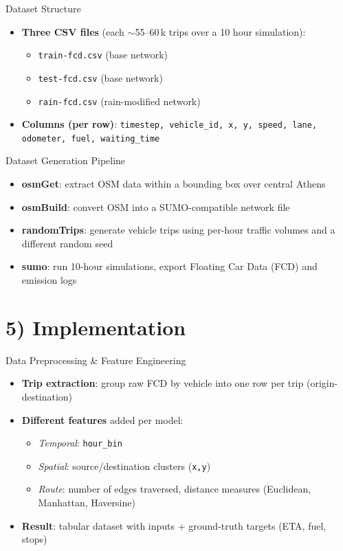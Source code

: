 \documentclass[aspectratio=169]{beamer}
\begin{document}
\begin{frame}{Dataset Structure}
  \begin{itemize}
    \item \textbf{Three CSV files} (each $\sim$55--60\,k trips over a 10 hour simulation):
      \begin{itemize}
        \item \texttt{train-fcd.csv} \quad (base network)
        \item \texttt{test-fcd.csv}  \quad (base network)
        \item \texttt{rain-fcd.csv}  \quad (rain-modified network)
      \end{itemize}
    \item \textbf{Columns (per row)}:
      \texttt{timestep, vehicle\_id, x, y, speed, lane, odometer, fuel, waiting\_time}
  \end{itemize}
\end{frame}

\begin{frame}{Dataset Generation Pipeline}
  \begin{itemize}
    \item \textbf{osmGet}: extract OSM data within a bounding box over central Athens
    \item \textbf{osmBuild}: convert OSM into a SUMO-compatible network file
    \item \textbf{randomTrips}: generate vehicle trips using per-hour traffic volumes and a different random seed
    \item \textbf{sumo}: run 10-hour simulations, export Floating Car Data (FCD) and emission logs
  \end{itemize}
\end{frame}

\section{5) Implementation}
\begin{frame}{Data Preprocessing \& Feature Engineering}
  \begin{itemize}
    \item \textbf{Trip extraction}: group raw FCD by vehicle into one row per trip (origin-destination)
    \item \textbf{Different features} added per model:
      \begin{itemize}
        \item \emph{Temporal}: \texttt{hour\_bin}
        \item \emph{Spatial}: source/destination clusters (\texttt{x,y})
        \item \emph{Route}: number of edges traversed, distance measures (Euclidean, Manhattan, Haversine)
      \end{itemize}
    \item \textbf{Result}: tabular dataset with inputs + ground-truth targets (ETA, fuel, stops)
  \end{itemize}
\end{frame}
\end{document}
